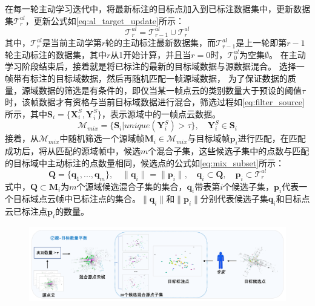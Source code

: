     在每一轮主动学习迭代中，将最新标注的目标点加入到已标注数据集中，更新数据集$\mathcal{T}^{al}_r$，更新公式如\eqref{eq:al_target_update}所示：
    \begin{equation}
        \label{eq:al_target_update}
        \mathcal{T}^{al}_r = \mathcal{T}^{al}_{r-1} \cup \mathcal{T}^{al}_r 
    \end{equation}
    其中，$\mathcal{T}^{al}_r$是当前主动学第$r$轮的主动标注最新数据集，而$\mathcal{T}^{al}_{r-1}$是上一轮即第$r-1$轮主动标注的数据集，其中$r$从1开始计算，并且当$r=0$时，$\mathcal{T}^{al}_0$为空集$\emptyset$。
    在主动学习阶段结束后，接着就是将已标注的最新的目标域数据与源数据混合。
    选择一帧带有标注的目标域数据，然后再随机匹配一帧源域数据，
    为了保证数据的质量，源域数据的筛选是有条件的，即仅当某一帧点云的类别数量大于预设的阈值$\tau$时，该帧数据才有资格与当前目标域数据进行混合，筛选过程如\eqref{eq:filter_source}所示，其中$\mathbf{S}_i = \{\mathbf{X}^S_i,\mathbf{Y}^S_i\}$，表示源域中的一帧点云数据。
    \begin{equation}
        \label{eq:filter_source}
        \mathcal{M}_{mix}= \{\mathbf{S}_i | unique(\mathbf{Y}^S_i)> \tau\}, \quad \mathbf{Y}^S_i \in \mathbf{S}_i
    \end{equation}
    接着，从$\mathcal{M}_{mix}$中随机筛选一个源域帧$\mathbf{M}_i \in \mathcal{M}_{mix}$与目标域帧$\mathbf{p}_i$进行匹配，在匹配成功后，将从匹配的源域帧中，候选$m$个混合子集，这些候选子集中的点数与匹配的目标域中主动标注的点数量相同，候选点的公式如\eqref{eq:mix_subset}所示：
    \begin{equation}
        \label{eq:mix_subset}
        \mathbf{Q} = \{\mathbf{q}_1,...,\mathbf{q}_m\}, 
        \quad
        \|\mathbf{q}_i\| = \|\mathbf{p}_i\|,
        \quad
        \mathbf{q}_i \subset \mathbf{Q},
        \quad
        \mathbf{p}_i \subset \mathcal{T}^{al}_r
    \end{equation}
    式中，$\mathbf{Q} \subset \mathbf{M}_i$为$m$个源域候选混合子集的集合，$\mathbf{q}_i$带表第$i$个候选子集，$\mathbf{p}_i$代表一个目标域点云帧中已标注点的集合。$\|\mathbf{q}_i\|$和$\|\mathbf{p}_i\|$分别代表候选子集$\mathbf{q}_i$和目标点云已标注点$\mathbf{p}_i$的数量。
    \vspace{-0.1cm}
    \begin{figure}[h]
        \centering
        \includegraphics[width = \textwidth, scale=0.5]{ljx/figure/4-2s-t.pdf}
        \label{fig:4-2}
    \end{figure}
    \vspace{-0.35cm}
